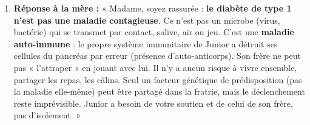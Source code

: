 \documentclass[11pt]{article}
\begin{document}
\begin{corrige}
\begin{enumerate}
\item \textbf{Réponse à la mère :} « Madame, soyez rassurée : \textbf{le diabète de type 1 n'est pas une maladie contagieuse}. Ce n'est pas un microbe (virus, bactérie) qui se transmet par contact, salive, air ou jeu. C'est une \textbf{maladie auto-immune} : le propre système immunitaire de Junior a détruit ses cellules du pancréas par erreur (présence d'auto-anticorps). Son frère ne peut pas « l'attraper » en jouant avec lui. Il n'y a aucun risque à vivre ensemble, partager les repas, les câlins. Seul un facteur génétique de prédisposition (pas la maladie elle-même) peut être partagé dans la fratrie, mais le déclenchement reste imprévisible. Junior a besoin de votre soutien et de celui de son frère, pas d'isolement. »
\end{enumerate}
\end{corrige}
\end{document}
